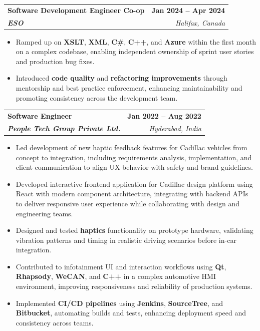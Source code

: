 \documentclass[letterpaper,11pt]{article}
\makeatletter
\newcommand{\resumeItem}[1]{
  \item\small{
    {#1 \vspace{-2pt}}
  }
}
\newcommand{\resumeSubheading}[4]{
  \vspace{-2pt}\item
    \begin{tabular*}{1.0\textwidth}[t]{l@{\extracolsep{\fill}}r}
      \textbf{#1} & \textbf{\small #2} \\
      \textit{\small#3} & \textit{\small #4} \\
    \end{tabular*}\vspace{-7pt}
}
\newcommand{\resumeItemListStart}{\begin{itemize}}
\newcommand{\resumeItemListEnd}{\end{itemize}\vspace{-5pt}}
\makeatother
\begin{document}
    \resumeSubheading
      {\textbf{Software Development Engineer Co-op}}{\textbf{Jan 2024 -- Apr 2024}}
      {\textbf{ESO}}{Halifax, Canada}
      \resumeItemListStart
        \resumeItem{Ramped up on \textbf{XSLT}, \textbf{XML}, \textbf{C\#}, \textbf{C++}, and \textbf{Azure} within the first month on a complex codebase, enabling independent ownership of sprint user stories and production bug fixes.}
        \resumeItem{Introduced \textbf{code quality} and \textbf{refactoring improvements} through mentorship and best practice enforcement, enhancing maintainability and promoting consistency across the development team.}
      \resumeItemListEnd

    \resumeSubheading
      {\textbf{Software Engineer}}{\textbf{Jan 2022 -- Aug 2022}}
      {\textbf{People Tech Group Private Ltd.}}{Hyderabad, India}
      \resumeItemListStart
        \resumeItem{Led development of new haptic feedback features for Cadillac vehicles from concept to integration, including requirements analysis, implementation, and client communication to align UX behavior with safety and brand guidelines.}
        \resumeItem{Developed interactive frontend application for Cadillac design platform using React with modern component architecture, integrating with backend APIs to deliver responsive user experience while collaborating with design and engineering teams.}
        \resumeItem{Designed and tested \textbf{haptics} functionality on prototype hardware, validating vibration patterns and timing in realistic driving scenarios before in-car integration.}
        \resumeItem{Contributed to infotainment UI and interaction workflows using \textbf{Qt}, \textbf{Rhapsody}, \textbf{WeCAN}, and \textbf{C++} in a complex automotive HMI environment, improving responsiveness and reliability of production systems.}
        \resumeItem{Implemented \textbf{CI/CD pipelines} using \textbf{Jenkins}, \textbf{SourceTree}, and \textbf{Bitbucket}, automating builds and tests, enhancing deployment speed and consistency across teams.}
      \resumeItemListEnd
\end{document}
